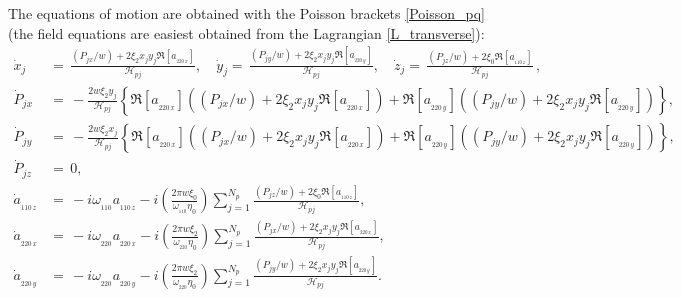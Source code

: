\documentclass[11pt]{article}
\newcommand{\HH}{\mathcal{H}}
\begin{document}
The equations of motion are obtained with the Poisson brackets \eqref{Poisson_pq}
(the field equations are easiest obtained from the Lagrangian \eqref{L_transverse}):
%
\begin{align}
\dot{x}_j &=\, \frac{(P_{jx}/w)+2\xi_2x_jy_j\Re[a_{_{220\, x}}]}{\HH_{pj}},\quad
\dot{y}_j =\,  \frac{(P_{jy}/w)+2\xi_2x_jy_j\Re[a_{_{220\, y}}]}{\HH_{pj}}, \quad
\dot{z}_j =\,  \frac{(P_{jz}/w)+2\xi_0 \Re[a_{_{110\, z}}]}{\HH_{pj}}\, ,
\label{dot_xyz_two_mode} \\
\dot{P}_{jx} &=\, -\frac{2w\xi_2y_j}{\HH_{pj}}
\left\{ 
\Re[a_{_{220\,x}}]\left( (P_{jx}/w)+2\xi_2x_jy_j\Re[a_{_{220\,x}}]\right)
+ \Re[a_{_{220\,y}}]\left((P_{jy}/w)+2\xi_2x_jy_j\Re[a_{_{220\,y}}]\right)
\right\}, \label{dot_Px_two_mode}\\
\dot{P}_{jy} &=\, -\frac{2w\xi_2x_j}{\HH_{pj}}
\left\{ 
\Re[a_{_{220\,x}}]\left( (P_{jx}/w)+2\xi_2x_jy_j\Re[a_{_{220\,x}}]\right)
+ \Re[a_{_{220\,y}}]\left((P_{jy}/w)+2\xi_2x_jy_j\Re[a_{_{220\,y}}]\right)
\right\}, \label{dot_Py_two_mode}\\
\dot{P}_{jz} &=\, 0 , \label{dot_Pz_two_mode}\\
\dot{a}_{_{110\,z}} &=\, -i\omega_{_{110}}a_{_{110\,z}}
- i\left(\frac{2\pi w\xi_0}{\omega_{_{110}}\eta_0} \right)
\sum_{j=1}^{N_p}\frac{(P_{jz}/w)+2\xi_0\Re[a_{_{110\,z}}]}{\HH_{pj}} ,
\label{dot_az} \\
\dot{a}_{_{220\,x}} &=\, -i\omega_{_{220}}a_{_{220\,x}}
- i\left(\frac{2\pi w\xi_2}{\omega_{_{220}}\eta_0} \right)
\sum_{j=1}^{N_p}\frac{(P_{jx}/w)+2\xi_2x_jy_j\Re[a_{_{220\,x}}]}{\HH_{pj}} ,
\label{dot_ax} \\
\dot{a}_{_{220\,y}} &=\, -i\omega_{_{220}}a_{_{220\,y}}
- i\left(\frac{2\pi w\xi_2}{\omega_{_{220}}\eta_0} \right)
\sum_{j=1}^{N_p}\frac{(P_{jy}/w)+2\xi_2x_jy_j\Re[a_{_{220\,y}}]}{\HH_{pj}} .
\label{dot_ay}
\end{align}
















\end{document}
